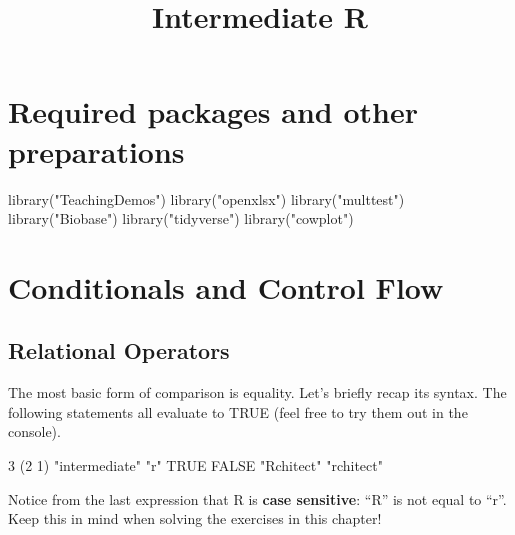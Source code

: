 \documentclass[]{article}
\title{Intermediate R}
\author{}
\date{}
\newcommand{\hlnum}[1]{\textcolor[rgb]{0.816,0.125,0.439}{#1}}%
\newcommand{\hlstr}[1]{\textcolor[rgb]{0.251,0.627,0.251}{#1}}%
\newcommand{\hlstd}[1]{\textcolor[rgb]{0.251,0.251,0.251}{#1}}%
\newcommand{\hlkwd}[1]{\textcolor[rgb]{0.878,0.439,0.125}{#1}}%
\newenvironment{Shaded}{\begin{myshaded}}{\end{myshaded}}
\newcommand{\KeywordTok}[1]{\hlkwd{#1}}
\newcommand{\DecValTok}[1]{\hlnum{#1}}
\newcommand{\StringTok}[1]{\hlstr{#1}}
\newcommand{\OtherTok}[1]{{#1}}
\newcommand{\NormalTok}[1]{\hlstd{#1}}
\begin{document}
\maketitle

{
\setcounter{tocdepth}{2}
\tableofcontents
\newpage
}
\section{Required packages and other
preparations}\label{required-packages-and-other-preparations}

\begin{Shaded}
\begin{Highlighting}[]
\KeywordTok{library}\NormalTok{(}\StringTok{"TeachingDemos"}\NormalTok{)}
\KeywordTok{library}\NormalTok{(}\StringTok{"openxlsx"}\NormalTok{)}
\KeywordTok{library}\NormalTok{(}\StringTok{"multtest"}\NormalTok{)}
\KeywordTok{library}\NormalTok{(}\StringTok{"Biobase"}\NormalTok{)}
\KeywordTok{library}\NormalTok{(}\StringTok{"tidyverse"}\NormalTok{)}
\KeywordTok{library}\NormalTok{(}\StringTok{"cowplot"}\NormalTok{)}
\end{Highlighting}
\end{Shaded}

\section{Conditionals and Control
Flow}\label{conditionals-and-control-flow}

\subsection{Relational Operators}\label{relational-operators}

The most basic form of comparison is equality. Let's briefly recap its
syntax. The following statements all evaluate to TRUE (feel free to try
them out in the console).

\begin{Shaded}
\begin{Highlighting}[]
\DecValTok{3} \OperatorTok{==}\StringTok{ }\NormalTok{(}\DecValTok{2} \OperatorTok{+}\StringTok{ }\DecValTok{1}\NormalTok{)}
\StringTok{"intermediate"} \OperatorTok{!=}\StringTok{ "r"}
\OtherTok{TRUE} \OperatorTok{!=}\StringTok{ }\OtherTok{FALSE}
\StringTok{"Rchitect"} \OperatorTok{!=}\StringTok{ "rchitect"}
\end{Highlighting}
\end{Shaded}

Notice from the last expression that R is \textbf{case sensitive}: ``R''
is not equal to ``r''. Keep this in mind when solving the exercises in
this chapter!
\end{document}
